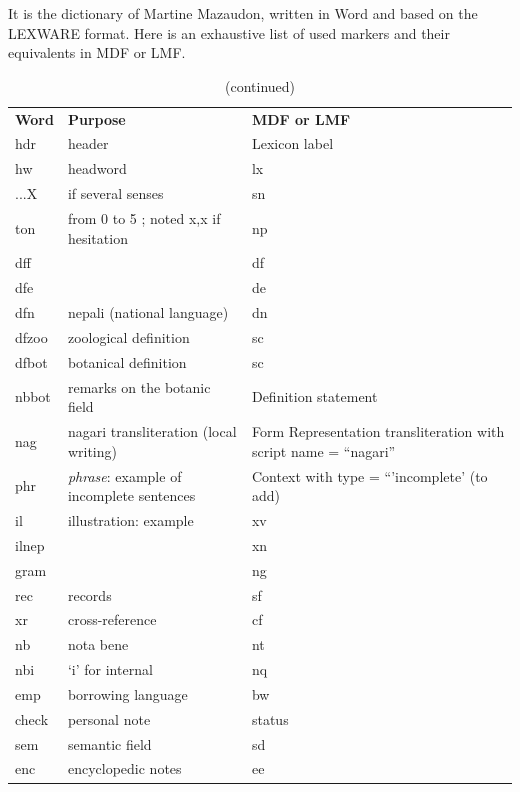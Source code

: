 \documentclass[a4paper,12pt]{article}
\begin{document}
It is the dictionary of Martine Mazaudon, written in Word and based on the LEXWARE format. Here is an exhaustive list of used markers and their equivalents in MDF or LMF.

\begin{center}
\begin{longtable}{|p{4cm}|p{5cm}|p{6cm}|}
\caption[]{Tamang dictionary: matching between Word and MDF or LMF} \\ \hline
\endfirsthead
\caption[]{(continued)} \\
\endhead
\endfoot
\endlastfoot
\textbf{Word} & \textbf{Purpose} & \textbf{MDF or LMF} \\ \hline
hdr & header & Lexicon label \\ \hline
hw & headword & lx \\ \hline
...X & if several senses & sn \\ \hline
ton & from 0 to 5 ; noted x,x if hesitation & np \\ \hline
dff & & df \\ \hline
dfe & & de \\ \hline
dfn & nepali (national language) & dn \\ \hline
dfzoo & zoological definition & sc \\ \hline
dfbot & botanical definition & sc \\ \hline
nbbot & remarks on the botanic field & Definition statement \\ \hline
nag & nagari transliteration (local writing) & Form Representation transliteration with script name = ``nagari'' \\ \hline
phr & \textit{phrase}: example of incomplete sentences & Context with type = ``'incomplete' (to add) \\ \hline
il & illustration: example & xv \\ \hline
ilnep & & xn \\ \hline
gram & & ng \\ \hline
rec & records & sf \\ \hline
xr & cross-reference & cf \\ \hline
nb & nota bene & nt \\ \hline
nbi & `i' for internal & nq \\ \hline
emp & borrowing language & bw \\ \hline
check & personal note & status \\ \hline
sem & semantic field & sd \\ \hline
enc & encyclopedic notes & ee \\ \hline

\end{longtable}
\end{center}
\end{document}
